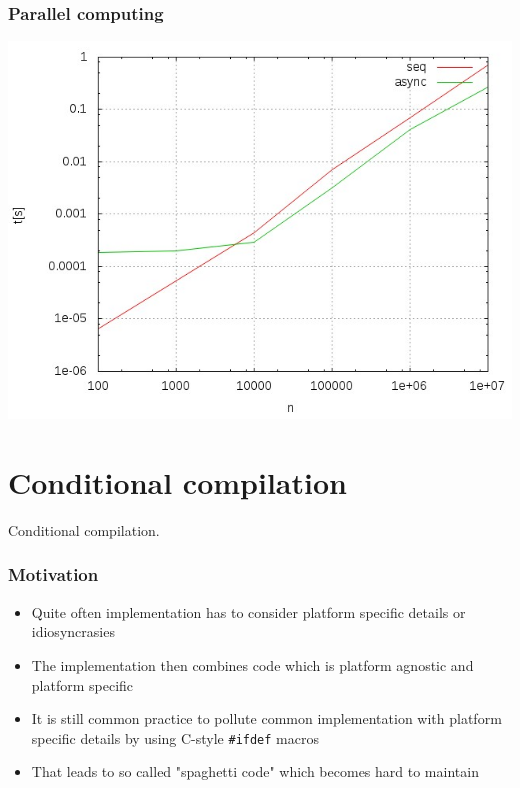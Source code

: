 \documentclass{beamer}
\begin{document}
\begin{frame}
\frametitle{Parallel computing}
	\includegraphics[width=\textwidth,height=0.8\textheight,keepaspectratio]
					{async.jpeg}
\end{frame}

\section{Conditional compilation}

\begin{frame}
    \begin{center}
        Conditional compilation.
    \end{center}
\end{frame}

\begin{frame}
\frametitle{Motivation}
    \begin{itemize}
        \item Quite often implementation has to consider platform specific details or idiosyncrasies
        \item The implementation then combines code which is platform agnostic and platform specific
        \item It is still common practice to pollute common implementation with platform specific details
              by using C-style \texttt{\#ifdef} macros
        \item That leads to so called "spaghetti code" which becomes hard to maintain
    \end{itemize}
\end{frame}
\end{document}
